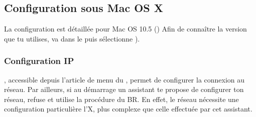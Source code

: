 

\clearpage

\subsection{Configuration sous Mac OS X}

La configuration est détaillée pour Mac OS 10.5 () %
Afin de connaître la version que tu utilises, va dans le  puis sélectionne ).

\subsubsection{Configuration IP}

 , accessible depuis l'article de menu  du , permet de configurer la connexion au réseau. Par ailleurs, si au démarrage un assistant te propose de configurer ton réseau, refuse et utilise la procédure du BR. En effet, le réseau nécessite une configuration particulière  l'X, plus complexe que celle effectuée par cet assistant.


